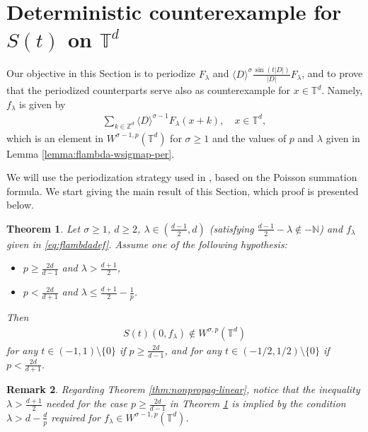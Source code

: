 \documentclass[a4paper, reqno, 11pt]{amsart}
\newtheorem{theorem}{Theorem}[section]
\newtheorem{remark}[theorem]{Remark}
\theoremstyle{definition}
\begin{document}
\section{Deterministic counterexample for $S(t)$ on $\mathbb{T}^d$}
\label{sec:localization}
Our objective in this Section is to periodize $F_{\lambda}$ and $\langle D \rangle^{\sigma} \frac{\sin(t|D|)}{|D|} F_{\lambda}$, and to prove that the periodized counterparts serve also as counterexample for $x \in \mathbb{T}^d$. Namely, $f_{\lambda}$ is given by
\begin{align}\label{eq:flambdadef-1}
\sum_{k \in \mathbb{Z}^d} \langle D \rangle^{\sigma - 1} F_{\lambda}(x+k), \quad x \in \mathbb{T}^d,
\end{align}
which is an element in $W^{\sigma-1,p}(\mathbb{T}^d)$ for $\sigma \geq 1$ and the values of $p$ and $\lambda$ given in Lemma \ref{lemma:flambda-wsigmap-per}.

We will use the periodization strategy used in \cite{W65}, based on the Poisson summation formula. We start giving the main result of this Section, which proof is presented below.

\begin{theorem}\label{thm:divergence-torus}
Let $\sigma \geq 1$, $d \geq 2$, $\lambda \in (\frac{d-1}{2},d)$ (satisfying $\frac{d-1}{2} - \lambda \notin -\mathbb{N}$) and $f_{\lambda}$ given in \eqref{eq:flambdadef}. Assume one of the following hypothesis:
\begin{itemize}
\item $p \geq \frac{2d}{d-1}$ and $\lambda > \frac{d+1}{2}$,
\item $p < \frac{2d}{d+1}$ and $\lambda \leq \frac{d+1}{2} - \frac{1}{p}$.
\end{itemize}
Then 
\begin{align*}
S(t)(0,f_{\lambda}) \notin W^{\sigma,p}(\mathbb{T}^d)
\end{align*}
for any $t \in (-1,1) \setminus \{0\}$ if $p \geq \frac{2d}{d-1}$, and for any $t \in (-1/2,1/2) \setminus \{0\}$ if $p < \frac{2d}{d+1}$.
\end{theorem}

\begin{remark}
Regarding Theorem \ref{thm:nonpropag-linear}, notice that the inequality $\lambda > \frac{d+1}{2}$ needed for the case $p \geq \frac{2d}{d-1}$ in Theorem \ref{thm:divergence-torus} is implied by the condition $\lambda > d - \frac{d}{p}$ required for $f_{\lambda} \in W^{\sigma-1,p}(\mathbb{T}^d)$.
\end{remark}

\end{document}
